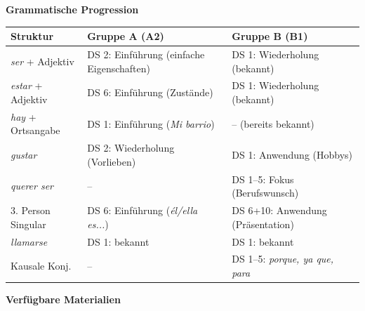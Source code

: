 \documentclass[11pt, a4paper]{article}
\newcommand{\es}[1]{\textcolor{spanisch}{\textit{#1}}}
\begin{document}
\newpage


{\large\bfseries\color{spanisch} Grammatische Progression}

\vspace{0.3cm}

\begin{center}
\begin{tabular}{|p{3cm}|p{5.5cm}|p{5.5cm}|}
\hline
\rowcolor{hellgrau}
\textbf{Struktur} & \textbf{\textcolor{gruppeA}{Gruppe A (A2)}} & \textbf{\textcolor{gruppeB}{Gruppe B (B1)}} \\
\hline
\es{ser} + Adjektiv & DS 2: Einführung (einfache Eigenschaften) & DS 1: Wiederholung (bekannt) \\
\hline
\es{estar} + Adjektiv & DS 6: Einführung (Zustände) & DS 1: Wiederholung (bekannt) \\
\hline
\es{hay} + Ortsangabe & DS 1: Einführung (\es{Mi barrio}) & -- (bereits bekannt) \\
\hline
\es{gustar} & DS 2: Wiederholung (Vorlieben) & DS 1: Anwendung (Hobbys) \\
\hline
\es{querer ser} & -- & DS 1--5: Fokus (Berufswunsch) \\
\hline
3. Person Singular & DS 6: Einführung (\es{él/ella es...}) & DS 6+10: Anwendung (Präsentation) \\
\hline
\es{llamarse} & DS 1: bekannt & DS 1: bekannt \\
\hline
Kausale Konj. & -- & DS 1--5: \es{porque, ya que, para} \\
\hline
\end{tabular}
\end{center}

\vspace{0.5cm}


{\large\bfseries\color{spanisch} Verfügbare Materialien}

\vspace{0.3cm}
\end{document}
